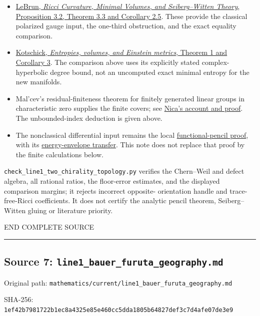 \documentclass[
  10pt,
]{article}
\providecommand{\tightlist}{%
  \setlength{\itemsep}{0pt}\setlength{\parskip}{0pt}}
\begin{document}
\begin{itemize}
\tightlist
\item
  \href{https://arxiv.org/html/math/0003068}{LeBrun, \emph{Ricci
  Curvature, Minimal Volumes, and Seiberg--Witten Theory}, Proposition
  3.2, Theorem 3.3 and Corollary 2.5}. These provide the classical
  polarized gauge input, the one-third obstruction, and the exact
  equality comparison.
\item
  \href{https://arxiv.org/html/math/0410215}{Kotschick, \emph{Entropies,
  volumes, and Einstein metrics}, Theorem 1 and Corollary 3}. The
  comparison above uses its explicitly stated complex-hyperbolic degree
  bound, not an uncomputed exact minimal entropy for the new manifolds.
\item
  Mal'cev's residual-finiteness theorem for finitely generated linear
  groups in characteristic zero supplies the finite covers; see
  \href{https://arxiv.org/abs/1306.2385}{Nica's account and proof}. The
  unbounded-index deduction is given above.
\item
  The nonclassical differential input remains the local
  \href{line1_functional_pencil.md}{functional-pencil proof}, with its
  \href{line1_energy_envelope_gap.md}{energy-envelope transfer}. This
  note does not replace that proof by the finite calculations below.
\end{itemize}

\nolinkurl{check_line1_two_chirality_topology.py} verifies the
Chern--Weil and defect algebra, all rational ratios, the floor-error
estimates, and the displayed comparison margins; it rejects incorrect
opposite- orientation handle and trace-free-Ricci coefficients. It does
not certify the analytic pencil theorem, Seiberg--Witten gluing or
literature priority.

END COMPLETE SOURCE

\begin{center}\rule{0.5\linewidth}{0.5pt}\end{center}

\hypertarget{source-7-line1_bauer_furuta_geography.md}{%
\subsection{Source 7:
\nolinkurl{line1_bauer_furuta_geography.md}}\label{source-7-line1_bauer_furuta_geography.md}}

Original path:
\nolinkurl{mathematics/current/line1_bauer_furuta_geography.md}

SHA-256:
\nolinkurl{1ef42b7981722b1ec8a4325e85e460cc5dda1805b64827def3c7d4afe07de3e9}
\end{document}
